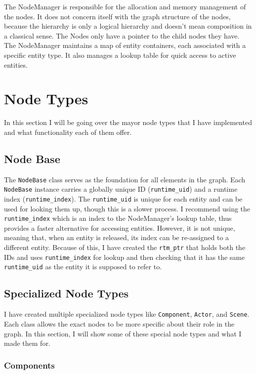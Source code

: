 The NodeManager is responsible for the allocation and memory management of the nodes.
It does not concern itself with the graph structure of the nodes, because the hierarchy is only a logical hierarchy and doesn't mean composition in a classical sense. The Nodes only have a pointer to the child nodes they have.
The NodeManager maintains a map of entity containers, each associated with a specific entity type.
It also manages a lookup table for quick access to active entities.


\section{Node Types}

In this section I will be going over the mayor node types that I have implemented and what functionality each of them offer.

\subsection{Node Base}

The \verb|NodeBase| class serves as the foundation for all elements in the graph. Each \verb|NodeBase| instance carries a globally unique ID (\verb|runtime_uid|) and a runtime index (\verb|runtime_index|). The \verb|runtime_uid| is unique for each entity and can be used for looking them up, though this is a slower process. I recommend using the \verb|runtime_index| which is an index to the NodeManager's lookup table, thus provides a faster alternative for accessing entities. However, it is not unique, meaning that, when an entity is released, its index can be re-assigned to a different entity. Because of this, I have created the \verb|rtm_ptr| that holds both the IDs and uses \verb|runtime_index| for lookup and then checking that it has the same \verb|runtime_uid| as the entity it is supposed to refer to.

\subsection{Specialized Node Types}

I have created multiple specialized node types like \verb|Component|, \verb|Actor|, and \verb|Scene|.
Each class allows the exact nodes to be more specific about their role in the graph. In this section, I will show some of these special node types and what I made them for.

\subsubsection{Components}

